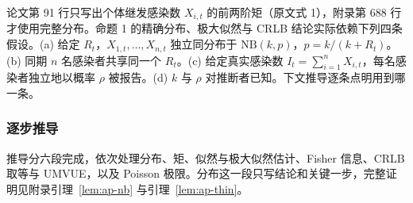 论文第 91 行只写出个体继发感染数 $X_{i,t}$ 的前两阶矩（原文式 1），附录第 688 行才使用完整分布。命题 1 的精确分布、极大似然与 CRLB 结论实际依赖下列四条假设。(a) 给定 $R_t$，$X_{1,t},\dots,X_{n,t}$ 独立同分布于 $\mathrm{NB}(k,p)$，$p=k/(k+R_t)$。(b) 同期 $n$ 名感染者共享同一个 $R_t$。(c) 给定真实感染数 $I_t=\sum_{i=1}^n X_{i,t}$，每名感染者独立地以概率 $\rho$ 被报告。(d) $k$ 与 $\rho$ 对推断者已知。下文推导逐条点明用到哪一条。

\subsubsection{逐步推导}

推导分六段完成，依次处理分布、矩、似然与极大似然估计、Fisher 信息、CRLB 取等与 UMVUE，以及 Poisson 极限。分布这一段只写结论和关键一步，完整证明见附录引理~\ref{lem:ap-nb} 与引理~\ref{lem:ap-thin}。
